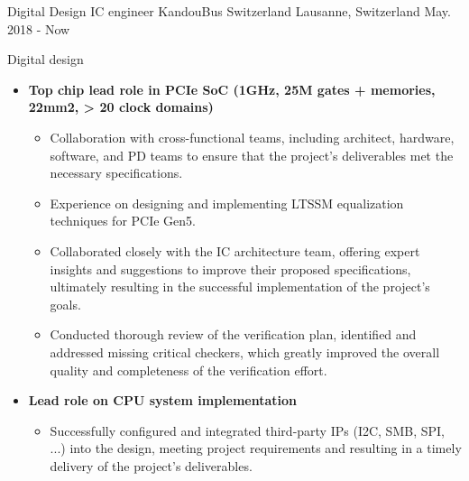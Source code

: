 

\begin{cventries}

  \cventry
    {Digital Design IC engineer} %
    {KandouBus Switzerland} %
    {Lausanne, Switzerland} %
    {May. 2018 - Now} %
    {
      \begin{cvitems} %
        \item {Digital design}
        \begin{itemize}
          \item {\textbf{Top chip lead role in PCIe SoC (1GHz, 25M gates + memories, 22mm2, > 20 clock domains)}}
          \begin{itemize}
            \item {Collaboration with cross-functional teams, including architect, hardware, software, and PD teams to ensure that the project's deliverables met the necessary specifications.}
            \item {Experience on designing and implementing LTSSM equalization techniques for PCIe Gen5.}
            \item {Collaborated closely with the IC architecture team, offering expert insights and suggestions to improve their proposed specifications, ultimately resulting in the successful implementation of the project's goals.}
            \item {Conducted thorough review of the verification plan, identified and addressed missing critical checkers, which greatly improved the overall quality and completeness of the verification effort.}
          \end{itemize}
          \item {\textbf{Lead role on CPU system implementation}}
          \begin{itemize}
            \item {Successfully configured and integrated third-party IPs (I2C, SMB, SPI, ...) into the design, meeting project requirements and resulting in a timely delivery of the project's deliverables.}

\end{itemize}
\end{itemize}
\end{cvitems}}
\end{cventries}
